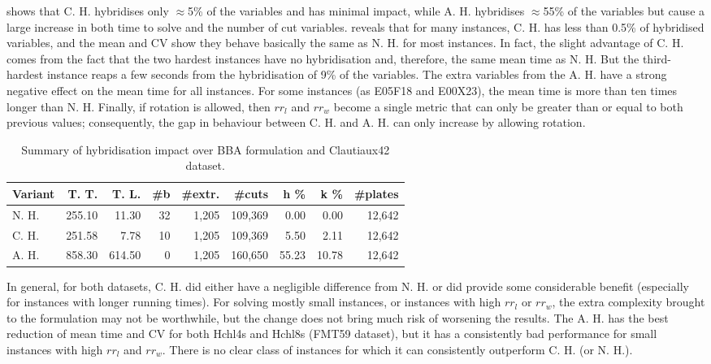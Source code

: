 \documentclass[ppgc,tese,english,formais,babel]{iiufrgs}
\begin{document}
 shows that C. H. hybridises only \(\approx\)5\% of the variables and has minimal impact, while A. H. hybridises \(\approx\)55\% of the variables but cause a large increase in both time to solve and the number of cut variables.
 reveals that for many instances, C. H. has less than 0.5\% of hybridised variables, and the mean and CV show they behave basically the same as N. H. for most instances.
In fact, the slight advantage of C. H. comes from the fact that the two hardest instances have no hybridisation and, therefore, the same mean time as N. H.
But the third-hardest instance reaps a few seconds from the hybridisation of 9\% of the variables.
The extra variables from the A. H. have a strong negative effect on the mean time for all instances.
For some instances (as E05F18 and E00X23), the mean time is more than ten times longer than N. H.
Finally, if rotation is allowed, then \(rr_l\) and \(rr_w\) become a single metric that can only be greater than or equal to both previous values; consequently, the gap in behaviour between C. H. and A. H. can only increase by allowing rotation.

\begin{table}
\caption{Summary of hybridisation impact over BBA formulation and Clautiaux42 dataset.}
\label{tab:g2opp_hyb_summary}
\begin{center}
\begin{tabular}{lrrrrrrrr}
\hline\hline
\textbf{Variant} & \textbf{T. T.} & \textbf{T. L.} & \textbf{\#b} & \textbf{\#extr.} &\textbf{\#cuts} & \textbf{h \%} & \textbf{k \%} & \textbf{\#plates} \\\hline
N. H. & 255.10 & 11.30 & 32 & 1,205 & 109,369 & 0.00 & 0.00 & 12,642 \\
C. H. & 251.58 & 7.78 & 10 & 1,205 & 109,369 & 5.50 & 2.11 & 12,642 \\
A. H. & 858.30 & 614.50 & 0 & 1,205 & 160,650 & 55.23 & 10.78 & 12,642 \\\hline\hline
\end{tabular}
\end{center}
\end{table}

In general, for both datasets, C. H. did either have a negligible difference from N. H. or did provide some considerable benefit (especially for instances with longer running times).
For solving mostly small instances, or instances with high \(rr_l\) or \(rr_w\), the extra complexity brought to the formulation may not be worthwhile, but the change does not bring much risk of worsening the results.
The A. H. has the best reduction of mean time and CV for both Hchl4s and Hchl8s (FMT59 dataset), but it has a consistently bad performance for small instances with high \(rr_l\) and \(rr_w\).
There is no clear class of instances for which it can consistently outperform C. H. (or N. H.).
\end{document}
